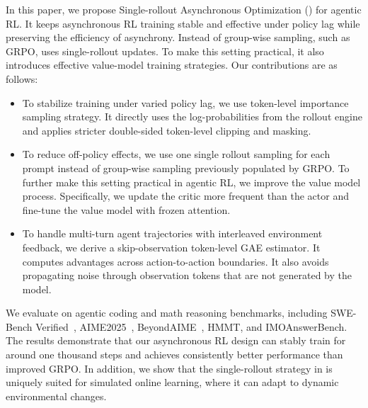 
In this paper, we propose Single-rollout Asynchronous Optimization (\model) for  agentic RL. 
It keeps asynchronous RL training  stable and effective under policy lag while preserving the efficiency of asynchrony.
Instead of group-wise sampling, such as GRPO, \model uses single-rollout updates.
To make this setting practical, it also introduces effective value-model training strategies. Our contributions are as follows:

\begin{itemize}[leftmargin=*,itemsep=0pt,parsep=0.2em,topsep=0.3em,partopsep=0.3em]
\item To stabilize training under varied policy lag, we use token-level importance sampling strategy. It directly uses the log-probabilities from the rollout engine and applies stricter double-sided token-level clipping and masking.

\item To reduce off-policy effects, we use one single rollout sampling for each prompt instead of group-wise sampling previously populated by GRPO. 
To further make this setting practical in agentic RL, we improve the value model process. Specifically, we update the critic more frequent than the actor and fine-tune the value model with frozen attention.

\item To handle multi-turn agent trajectories with interleaved environment feedback, we derive a skip-observation token-level GAE estimator. 
It computes advantages across action-to-action boundaries. It also avoids propagating noise through observation tokens that are not generated by the model.

\end{itemize}


We evaluate \model{} on agentic coding and math reasoning benchmarks, including SWE-Bench Verified~\citep{jimenez2023swe}, AIME2025~\citep{balunovic2025matharena}, BeyondAIME~\citep{bytedance_seed_2025_beyondaime}, HMMT\citep{balunovic2025matharena}, and IMOAnswerBench\citep{luong-etal-2025-towards}.
The results demonstrate that our asynchronous RL design can stably train for around one thousand steps and achieves consistently better performance than improved GRPO. In addition, we show that the single-rollout strategy in \model is uniquely suited for simulated online learning, where it can adapt to dynamic environmental changes. 
